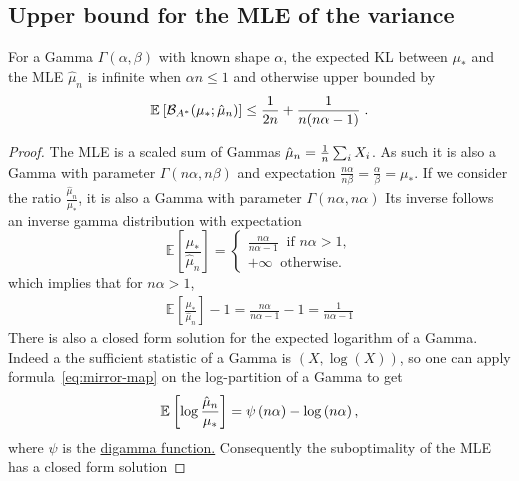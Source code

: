\documentclass[twoside]{article}
\newcommand*{\expect}[2][]{\ensuremath{\mathbb{E}_{#1} \left[ #2 \right] }} %
\newcommand{\logpart}{A}
\newcommand{\bregmanconj}{\cB_{\logpart^*}}
\newcommand{\m}{\mu}
\newcommand{\MAPm}{\hat \m_n}
\begin{document}
\subsection{Upper bound for the MLE of the variance}

	\begin{theorem}
	For a Gamma $\Gamma(\alpha, \beta)$ with known shape $\alpha$,
	the expected KL between $\mu_*$ and the MLE $\hat\mu_n$	is infinite when $\alpha n\leq 1$ and otherwise upper bounded by
	\begin{align}
		 \expect{\bregmanconj( \mu_*; \hat \mu_n) }
			\leq \inv{2n} + \frac{1}{n(n \alpha-1)}  \; .
	\end{align}
	\end{theorem}
	
	\begin{proof}
	The MLE is a scaled sum of Gammas $\hat \mu_n = \frac{1}{n} \sum_i X_i$.
	As such it is also a Gamma with parameter $\Gamma(n \alpha, n \beta)$ and expectation $\frac{n\alpha}{n\beta} = \frac{\alpha}{\beta} = \mu_*$.
	If we consider the ratio $\frac{\MAPm}{\mu_*}$, it is also a Gamma with parameter $\Gamma(n \alpha, n \alpha)$ 
	Its inverse follows an inverse gamma distribution with expectation
	\begin{equation}
		\expect{\frac{\mu_*}{\hat \mu_n}} 
		= \begin{cases}
			\frac{n\alpha}{n \alpha -1 }\ \text{ if } n\alpha > 1, \\
			+\infty \  \text{ otherwise. }
		\end{cases}
	\end{equation}
	which implies that for $n\alpha>1$, 
	\begin{align}
		\expect{\frac{\mu_*}{\hat \mu_n}} -1  
		= \frac{n \alpha}{n\alpha -1 } - 1
		= \frac{1}{n \alpha -1}
	\end{align}
	There is also a closed form solution for the expected logarithm of a Gamma.
	Indeed a the sufficient statistic of a Gamma is $(X, \log(X))$, so one can apply formula~\eqref{eq:mirror-map} on the log-partition of a Gamma to get
	\begin{align}
		\expect{\log \frac{\hat \mu_n}{\mu_*}} 
		= \psi\paren{n \alpha} - \log\paren{n \alpha},
	\end{align}
	where $\psi$ is the \href{https://en.wikipedia.org/wiki/Digamma_function}{digamma function.}
	Consequently the suboptimality of the MLE has a closed form solution

\end{proof}
\end{document}
